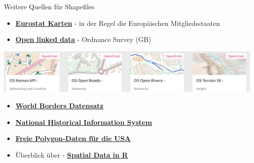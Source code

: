 \documentclass[ignorenonframetext,]{beamer}
\begin{document}
\begin{frame}{Weitere Quellen für Shapefiles}

\begin{itemize}
\item
  \href{http://epp.eurostat.ec.europa.eu/portal/page/portal/gisco_Geographical_information_maps/popups/\%20references/administrative_units_statistical_units_1}{\textbf{Eurostat
  Karten}} - in der Regel die Europäischen Mitgliedsstaaten
\item
  \href{https://www.ordnancesurvey.co.uk/business-and-government/products/opendata-products-grid.html}{\textbf{Open
  linked data}} - Ordnance Survey (GB)
\end{itemize}

\includegraphics{figure/OpenLinkedData.PNG}

\begin{itemize}
\item
  \href{http://thematicmapping.org/downloads/world_borders.php}{\textbf{World
  Borders Datensatz}}
\item
  \href{https://www.nhgis.org/}{\textbf{National Historical Information
  System}}
\item
  \href{http://www.freemapdata.com/html/free_polygon_data.html}{\textbf{Freie
  Polygon-Daten für die USA}}
\item
  Überblick über -
  \href{https://science.nature.nps.gov/im/datamgmt/statistics/r/advanced/spatial.cfm}{\textbf{Spatial
  Data in R}}
\end{itemize}

\end{frame}
\end{document}
